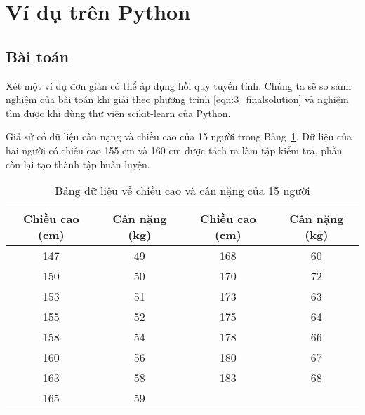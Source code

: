 





\section{Ví dụ trên Python}


\subsection{Bài toán}

Xét một ví dụ đơn giản có thể áp dụng hồi quy tuyến tính. Chúng ta sẽ so
sánh nghiệm của bài toán khi giải theo phương trình \eqref{eqn:3_finalsolution}
và nghiệm tìm được khi dùng thư viện scikit-learn của Python.

Giả sử có dữ liệu cân nặng và chiều cao của 15 người trong Bảng~\ref{tab:3_height_weight}. Dữ liệu của hai người có chiều cao 155 cm và 160 cm được tách ra làm tập kiểm tra, phần còn lại tạo thành tập huấn luyện.

\begin{table}[h!]
\centering
\caption{Bảng dữ liệu về chiều cao và cân nặng của 15 người}
\label{tab:3_height_weight}
\begin{tabular}{|c|c||c|c|}
\hline
\textbf{Chiều cao (cm)} & \textbf{Cân nặng (kg)} & \textbf{Chiều cao (cm)} & \textbf{Cân nặng (kg)} \\ \hline
\hline
147                     & 49                     & 168                     & 60                     \\ \hline
150                     & 50                     & 170                     & 72                     \\ \hline
153                     & 51                     & 173                     & 63                     \\ \hline
155                     & 52                     & 175                     & 64                     \\ \hline
158                     & 54                     & 178                     & 66                     \\ \hline
160                     & 56                     & 180                     & 67                     \\ \hline
163                     & 58                     & 183                     & 68                     \\ \hline
165                     & 59                     &                         &                        \\ \hline
\end{tabular}
\end{table}

